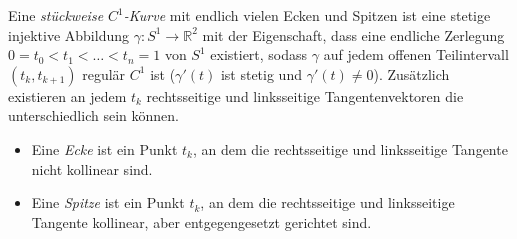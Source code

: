 \begin{definition}
    Eine \emph{stückweise $C^1$-Kurve} mit endlich vielen Ecken und Spitzen ist eine stetige injektive Abbildung $\gamma: S^1 \to \mathbb{R}^2$ mit der Eigenschaft, dass eine endliche Zerlegung $0 = t_0 < t_1 < \ldots < t_n = 1$ von $S^1$ existiert, sodass $\gamma$ auf jedem offenen Teilintervall $(t_{k}, t_{k+1})$ regulär $C^1$ ist ($\gamma'(t)$ ist stetig und $\gamma'(t) \neq 0$).
    Zusätzlich existieren an jedem $t_k$ rechtsseitige und linksseitige Tangentenvektoren die unterschiedlich sein können. 
    \begin{itemize}
        \item Eine \emph{Ecke} ist ein Punkt $t_k$, an dem die rechtsseitige und linksseitige Tangente nicht kollinear sind.
%
        \item Eine \emph{Spitze} ist ein Punkt $t_k$, an dem die rechtsseitige und linksseitige Tangente kollinear, aber entgegengesetzt gerichtet sind.
%
    \end{itemize}
\end{definition}
